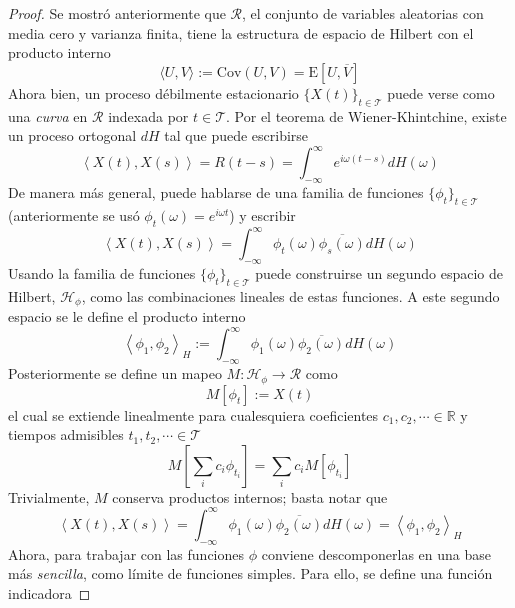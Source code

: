 \documentclass[12pt,letterpaper]{book}
\newcommand{\R}{\mathbb{R}}
\newcommand{\intR}{\int_{-\infty}^{\infty}}
\newcommand{\E}[1]{\mathrm{E}\left[ #1 \right]}
\newcommand{\Cov}[1]{\mathrm{Cov}\left( #1 \right)}
\newcommand{\xt}{$\{X(t)\}_{t\in \mathcal{T}}$ }
\newcommand{\pint}[1]{\left\langle #1 \right\rangle}
\begin{document}
\begin{proof}
Se mostró anteriormente que $\mathcal{R}$, el conjunto de variables aleatorias con media cero y varianza finita, tiene la estructura de espacio de Hilbert con el producto interno
\begin{equation}
\langle U , V \rangle := \Cov{U,V} = \E{U, \overline{V}}
\end{equation}
Ahora bien, un proceso débilmente estacionario \xt puede verse como una \textit{curva} en $\mathcal{R}$ indexada por $t \in \mathcal{T}$.
%
Por el teorema de Wiener-Khintchine, existe un proceso ortogonal $dH$ tal que puede escribirse
\begin{equation}
\pint{X(t),X(s)} = R(t-s) = \intR e^{i \omega (t-s)} dH(\omega)
\end{equation} 
De manera más general, puede hablarse de una familia de funciones $\{ \phi_t \}_{t\in \mathcal{T}}$ (anteriormente se usó $\phi_t(\omega) = e^{i \omega t}$) y escribir
\begin{equation}
\pint{X(t),X(s)} = \intR \phi_t(\omega) \overline{\phi_s(\omega)} dH(\omega)
\end{equation} 
Usando la familia de funciones $\{ \phi_t \}_{t\in \mathcal{T}}$ puede construirse un segundo espacio de Hilbert, $\mathcal{H}_\phi$, como las combinaciones lineales de estas funciones.
A este segundo espacio se le define el producto interno
\begin{equation}
\pint{\phi_1,\phi_2}_H := \intR \phi_1(\omega) \overline{\phi_2(\omega)} dH(\omega)
\end{equation} 
Posteriormente se define un mapeo $M : \mathcal{H}_\phi \rightarrow \mathcal{R}$ como
\begin{equation}
M[\phi_t] := X(t)
\end{equation}
el cual se extiende linealmente para cualesquiera coeficientes $c_1, c_2, \cdots \in \R$ y tiempos admisibles $t_1, t_2, \cdots \in \mathcal{T}$
\begin{equation}
M\left[ \sum_i c_i \phi_{t_i} \right] = \sum_i c_i M\left[ \phi_{t_i} \right]
\end{equation}
Trivialmente, $M$ conserva productos internos; basta notar que
\begin{equation}
\pint{X(t),X(s)} = \intR \phi_1(\omega) \overline{\phi_2(\omega)} dH(\omega) = \pint{\phi_1,\phi_2}_H
\end{equation}
Ahora, para trabajar con las funciones $\phi$ conviene descomponerlas en una base más \textit{sencilla}, como límite de funciones simples. Para ello, se define una función indicadora

\end{proof}
\end{document}
